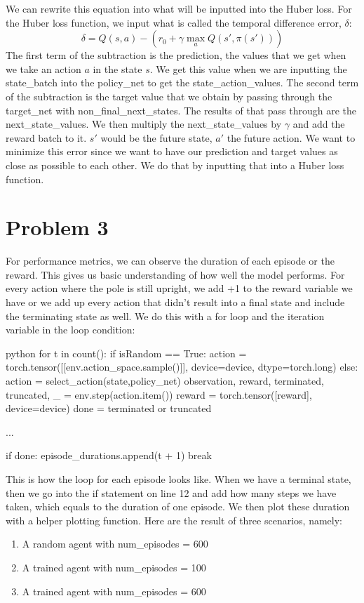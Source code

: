 \documentclass{article}
\numberwithin{equation}{section}
\numberwithin{equation}{section}
\begin{document}
We can rewrite this equation into what will be inputted into the Huber loss.
For the Huber loss function, we input what is called the temporal difference error, $\delta$:
$$
\delta = Q(s,a) - \left(r_0 + \gamma \max_a Q(s',\pi(s'))\right)
$$
The first term of the subtraction is the prediction, the values that we get when we take an action $a$ in the state $s$. We get this value when we are inputting the state\_batch into the policy\_net to get the state\_action\_values. The second term of the subtraction is the target value that we obtain by passing through the target\_net with non\_final\_next\_states. The results of that pass through are the next\_state\_values. We then multiply the next\_state\_values by $\gamma$ and add the reward batch to it. $s'$ would be the future state, $a'$ the future action.  We want to minimize this error since we want to have our prediction and target values as close as possible to each other. We do that by inputting that into a Huber loss function. 










\section*{Problem 3}
For performance metrics, we can observe the duration of each episode or the reward. This gives us basic understanding of how well the model performs. For every action where the pole is still upright, we add +1 to the reward variable we have or we add up every action that didn't result into a final state and include the terminating state as well. We do this with a for loop and the iteration variable in the loop condition:


\begin{mintedbox}{python}
for t in count():
	if isRandom  == True:
	  action = torch.tensor([[env.action_space.sample()]], device=device, dtype=torch.long)
	else:
	  action = select_action(state,policy_net)
	observation, reward, terminated, truncated, _ = env.step(action.item())
	reward = torch.tensor([reward], device=device)
	done = terminated or truncated

	...
	
	if done:
		episode_durations.append(t + 1)
		break
\end{mintedbox}

This is how the loop for each episode looks like. When we have a terminal state, then we go into the if statement on line 12 and add how many steps we have taken, which equals to the duration of one episode. We then plot these duration with a helper plotting function. Here are the result of three scenarios, namely:
\begin{enumerate}
\item A random agent with num\_episodes = 600
\item A trained agent with num\_episodes = 100
\item A trained agent with num\_episodes = 600
\end{enumerate}
\end{document}
